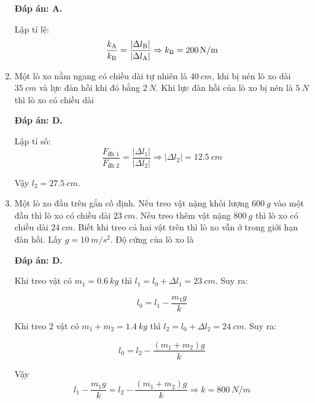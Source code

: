 \begin{enumerate}[label=\bfseries Câu \arabic*:]
	\hideall
	{	
		\textbf{Đáp án: A.}
		
		Lập tỉ lệ:
		$$\dfrac{k_\text A}{k_\text B} = \dfrac{|\Delta l_\text B|}{|\Delta l_\text A|} \Rightarrow k_\text{B} = \SI{200}{N/m}$$
	}
	
	\item {}
	
	
	{
		Một lò xo nằm ngang có chiều dài tự nhiên là $\SI{40}{cm}$, khi bị nén lò xo dài $\SI{35}{cm}$ và lực đàn hồi khi đó bằng $\SI{2}{N}$. Khi lực đàn hồi của lò xo bị nén là $\SI{5}{N}$ thì lò xo có chiều dài
	}
	
	\hideall
	{	
		\textbf{Đáp án: D.}	
		
		Lập tỉ số:
		$$\dfrac{F_\text{đh 1}}{F_\text{đh 2}} = \dfrac{|\Delta l_1|}{|\Delta l_2|} \Rightarrow |\Delta l_2| = \SI{12.5}{cm}$$
		
		Vậy $l_2 = \SI{27.5}{cm}$.
	}
	\item {}
	
	
	{
		Một lò xo đầu trên gắn cố định. Nếu treo vật nặng khối lượng $\SI{600}{g}$ vào một đầu thì lò xo có chiều dài $\SI{23}{cm}$. Nếu treo thêm vật nặng $\SI{800}{g}$ thì lò xo có chiều dài $\SI{24}{cm}$. Biết khi treo cả hai vật trên thì lò xo vẫn ở trong giới hạn đàn hồi. Lấy $g=\SI{10}{m/s^2}$. Độ cứng của lò xo là
	}
	
	\hideall
	{	
		\textbf{Đáp án: D.}
		
		Khi treo vật có $m_1=\SI{0.6}{kg}$ thì $l_1 = l_0 + \Delta l_1 = \SI{23}{cm}$. Suy ra:
		
		$$l_0 = l_1 - \dfrac{m_1 g}{k}$$
		
		Khi treo 2 vật có $m_1+m_2 = \SI{1.4}{kg}$ thì $l_2 = l_0 + \Delta l_2 = \SI{24}{cm}$. Suy ra:
		
		$$l_0 = l_2 - \dfrac{(m_1+m_2)g}{k}$$
		
		Vậy $$l_1 - \dfrac{m_1 g}{k} =l_2 - \dfrac{(m_1+m_2)g}{k} \Rightarrow k = \SI{800}{N/m} $$
	}

\end{enumerate}
